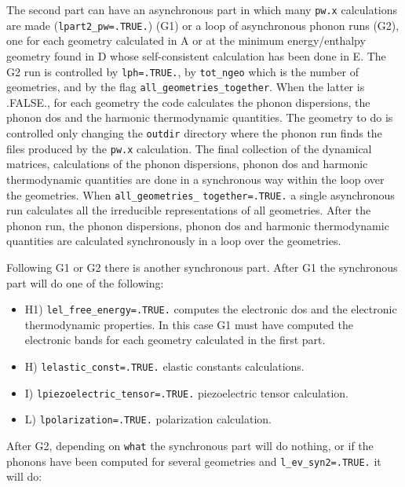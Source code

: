 \documentclass[12pt,a4paper,twoside]{report}
\begin{document}
The second part can have an asynchronous part in which
many \texttt{pw.x} calculations are made (\texttt{lpart2\_pw=.TRUE.}) (G1)
or a loop of asynchronous phonon runs (G2), one for each geometry calculated
in A or at the minimum energy/enthalpy geometry
found in D whose self-consistent calculation has been done in E.
The G2 run is controlled by \texttt{lph=.TRUE.}, by \texttt{tot\_ngeo} which 
is the number of geometries, and by the flag 
\texttt{all\_geometries\_together}. When the latter is .FALSE.,
for each geometry the code calculates the phonon dispersions, the phonon 
dos and the 
harmonic thermodynamic quantities. The geometry to do is controlled only 
changing the \texttt{outdir} directory where the phonon run finds the
files produced by the \texttt{pw.x} calculation. The final collection
of the dynamical matrices, calculations of the phonon dispersions, phonon 
dos and harmonic thermodynamic quantities are done in a synchronous way 
within the loop over the geometries.
When \texttt{all\_geometries\_} \texttt{together=.TRUE.} a single asynchronous run
calculates all the irreducible representations of all geometries. After
the phonon run, the phonon dispersions, phonon dos and harmonic 
thermodynamic quantities are calculated synchronously in a loop over 
the geometries.

Following G1 or G2 there is another synchronous part. 
After G1 the synchronous part will do one of the following:

\begin{itemize}

\item
H1) \texttt{lel\_free\_energy=.TRUE.} computes the electronic dos and
the electronic thermodynamic properties. In this case G1 must have
computed the electronic bands for each geometry calculated in the first part.

\item
H) \texttt{lelastic\_const=.TRUE.} elastic constants calculations.

\item
I) \texttt{lpiezoelectric\_tensor=.TRUE.} piezoelectric tensor calculation.

\item
L) \texttt{lpolarization=.TRUE.} polarization calculation.

\end{itemize}

After G2, depending on \texttt{what} the synchronous part will do nothing, 
or if the phonons have been computed for several geometries and
\texttt{l\_ev\_syn2=.TRUE.} it will do:
\end{document}
